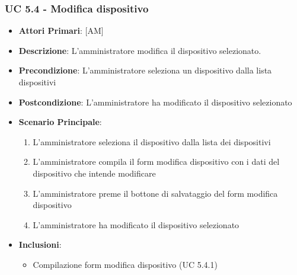 			\subsubsection{UC 5.4 - Modifica dispositivo}
			\begin{itemize}
				\item \textbf{Attori Primari}: [AM]
				\item \textbf{Descrizione}: L'amministratore modifica il dispositivo selezionato.
				\item \textbf{Precondizione}: L'amministratore seleziona un dispositivo dalla lista dispositivi
				\item \textbf{Postcondizione}: L'amministratore ha modificato il dispositivo selezionato
				\item \textbf{Scenario Principale}:
				\begin{enumerate}
					\item{L'amministratore seleziona il dispositivo dalla lista dei dispositivi}
					\item{L'amministratore compila il form modifica dispositivo con i dati del dispositivo che intende modificare}
					\item{L'amministratore preme il bottone di salvataggio del form modifica dispositivo}
					\item{L'amministratore ha modificato il dispositivo selezionato}
				\end{enumerate}
				\item \textbf{Inclusioni}:
				\begin{itemize}
					\item Compilazione form modifica dispositivo (UC 5.4.1)
				\end{itemize}
			\end{itemize}
			

